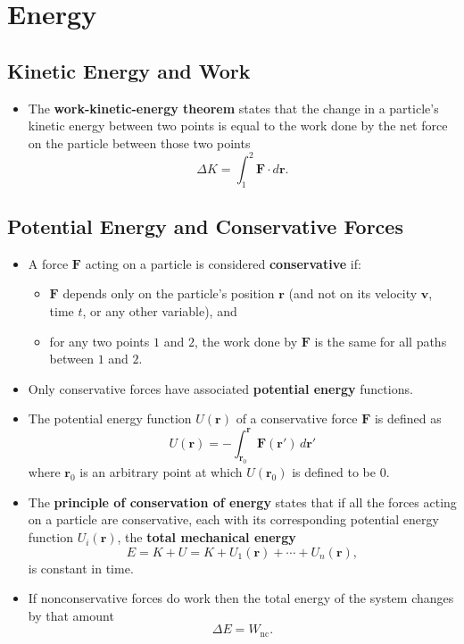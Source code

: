 \documentclass{article}
\renewcommand{\vec}[1]{\boldsymbol{\mathbf{#1}}}
\begin{document}
\section{Energy}

\subsection{Kinetic Energy and Work}

\begin{itemize}
  \item The \textbf{work-kinetic-energy theorem} states that the change in a particle's kinetic energy between two points is equal to the work done by the net force on the particle between those two points \[\Delta K = \int_1^2 \vec{F} \cdot d \vec{r}.\]
\end{itemize}

\subsection{Potential Energy and Conservative Forces}

\begin{itemize}
  \item A force $\vec{F}$ acting on a particle is considered \textbf{conservative} if:

        \begin{itemize}
          \item $\vec{F}$ depends only on the particle's position $\vec{r}$ (and not on its velocity $\vec{v}$, time $t$, or any other variable), and

          \item for any two points $1$ and $2$, the work done by $\vec{F}$ is the same for all paths between $1$ and $2$.
        \end{itemize}

  \item Only conservative forces have associated \textbf{potential energy} functions.

  \item The potential energy function $U(\vec{r})$ of a conservative force $\vec{F}$ is defined as \[U(\vec{r}) = -\int_{\vec{r}_0}^{\vec{r}} \vec{F}(\vec{r}') \,d \vec{r}'\] where $\vec{r}_0$ is an arbitrary point at which $U(\vec{r}_0)$ is defined to be $0$.

  \item The \textbf{principle of conservation of energy} states that if all the forces acting on a particle are conservative, each with its corresponding potential energy function $U_i(\vec{r})$, the \textbf{total mechanical energy} \[E = K + U = K + U_1(\vec{r}) + \cdots + U_n(\vec{r}),\] is constant in time.

  \item If nonconservative forces do work then the total energy of the system changes by that amount \[\Delta E = W_\text{nc}.\]
\end{itemize}
\end{document}
